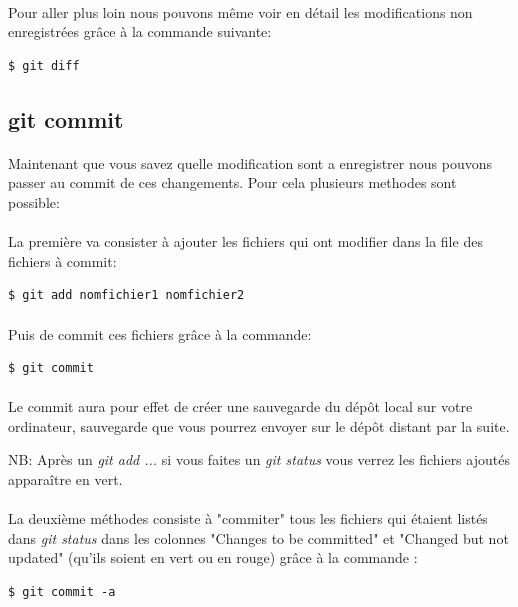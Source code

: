 \documentclass[french, a4paper, 12pt, titlepage]{article}
\begin{document}
\paragraph{}Pour aller plus loin nous pouvons même voir en détail les modifications non enregistrées grâce à la commande suivante:
\begin{lstlisting}
$ git diff
\end{lstlisting}

\subsection{git commit}
\paragraph{}Maintenant que vous savez quelle modification sont a enregistrer nous pouvons passer au commit de ces changements. Pour cela plusieurs methodes sont possible:

\paragraph{}La première va consister à ajouter les fichiers qui ont modifier dans la file des fichiers à commit:
\begin{lstlisting}
$ git add nomfichier1 nomfichier2
\end{lstlisting}
\paragraph{}Puis de commit ces fichiers grâce à la commande:
\begin{lstlisting}
$ git commit
\end{lstlisting}
\paragraph{}Le commit aura pour effet de créer une sauvegarde du dépôt local sur votre ordinateur, sauvegarde que vous pourrez envoyer sur le dépôt distant par la suite.

NB: Après un \emph{git add ...} si vous faites un \emph{git status} vous verrez les fichiers ajoutés apparaître en vert.

\paragraph{}La deuxième méthodes consiste à "commiter" tous les fichiers qui étaient listés dans \emph{git status} dans les colonnes "Changes to be committed" et "Changed but not updated" (qu’ils soient en vert ou en rouge) grâce à la commande :
\begin{lstlisting}
$ git commit -a
\end{lstlisting}
\end{document}
